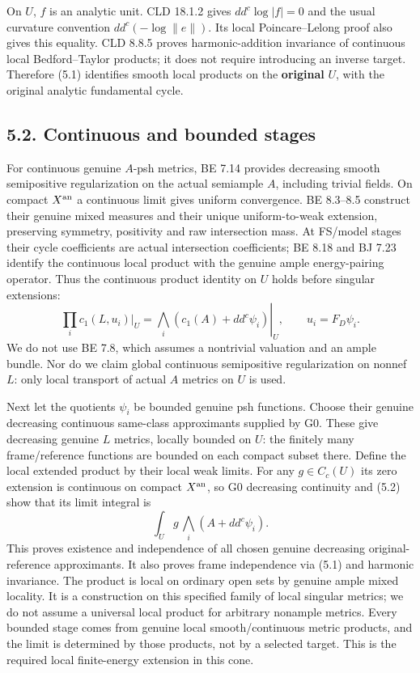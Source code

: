 \documentclass[
  10pt,
]{article}
\begin{document}
On \(U\), \(f\) is an analytic unit. CLD 18.1.2 gives \(dd^c\log|f|=0\)
and the usual curvature convention \(dd^c(-\log\|e\|)\). Its local
Poincare--Lelong proof also gives this equality. CLD 8.8.5 proves
harmonic-addition invariance of continuous local Bedford--Taylor
products; it does not require introducing an inverse target. Therefore
(5.1) identifies smooth local products on the \textbf{original} \(U\),
with the original analytic fundamental cycle.

\subsection{5.2. Continuous and bounded
stages}\label{continuous-and-bounded-stages}

For continuous genuine \(A\)-psh metrics, BE 7.14 provides decreasing
smooth semipositive regularization on the actual semiample \(A\),
including trivial fields. On compact \(X^{\rm an}\) a continuous limit
gives uniform convergence. BE 8.3--8.5 construct their genuine mixed
measures and their unique uniform-to-weak extension, preserving
symmetry, positivity and raw intersection mass. At FS/model stages their
cycle coefficients are actual intersection coefficients; BE 8.18 and BJ
7.23 identify the continuous local product with the genuine ample
energy-pairing operator. Thus the continuous product identity on \(U\)
holds before singular extensions: \[
 \prod_i c_1(L,u_i)|_U
        =\left.\bigwedge_i(c_1(A)+dd^c\psi_i)\right|_U,
                     \qquad u_i=F_D\psi_i.                   \tag{5.2}
\] We do not use BE 7.8, which assumes a nontrivial valuation and an
ample bundle. Nor do we claim global continuous semipositive
regularization on nonnef \(L\): only local transport of actual \(A\)
metrics on \(U\) is used.

Next let the quotients \(\psi_i\) be bounded genuine psh functions.
Choose their genuine decreasing continuous same-class approximants
supplied by G0. These give decreasing genuine \(L\) metrics, locally
bounded on \(U\): the finitely many frame/reference functions are
bounded on each compact subset there. Define the local extended product
by their local weak limits. For any \(g\in C_c(U)\) its zero extension
is continuous on compact \(X^{\rm an}\), so G0 decreasing continuity and
(5.2) show that its limit integral is \[
                    \int_U g\,\bigwedge_i(A+dd^c\psi_i).      \tag{5.3}
\] This proves existence and independence of all chosen genuine
decreasing original-reference approximants. It also proves frame
independence via (5.1) and harmonic invariance. The product is local on
ordinary open sets by genuine ample mixed locality. It is a construction
on this specified family of local singular metrics; we do not assume a
universal local product for arbitrary nonample metrics. Every bounded
stage comes from genuine local smooth/continuous metric products, and
the limit is determined by those products, not by a selected target.
This is the required local finite-energy extension in this cone.
\end{document}
